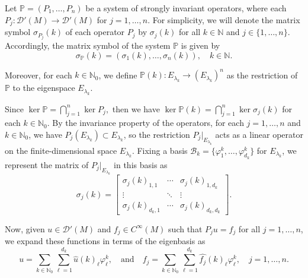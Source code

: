 \documentclass{amsart}
\theoremstyle{definition}
\theoremstyle{remark}
\numberwithin{equation}{section}
\begin{document}
	
	Let $\mathbb{P}=(P_1,\dots,P_n)$ be a system of strongly invariant operators, where each $P_j:\mathscr{D}'(M)\to \mathscr{D}'(M)$ for $j=1,\dots,n$. For simplicity, we will denote the matrix symbol $\sigma_{P_j}(k)$ of each operator $P_j$ by $\sigma_j(k)$ for all $k\in\mathbb{N}$ and $j\in\{1,\dots,n\}$. Accordingly, the matrix symbol of the system $\mathbb{P}$ is given by  
	\begin{equation*}
		\sigma_{\mathbb{P}}(k) = (\sigma_1(k), \ldots, \sigma_n(k)), \quad k\in\mathbb{N}.
	\end{equation*}
	
	Moreover, for each $k\in\mathbb{N}_0$, we define $\mathbb{P}(k):E_{\lambda_k}\to (E_{\lambda_k})^n$ as the restriction of $\mathbb{P}$ to the eigenspace $E_{\lambda_k}$.

	
	Since $\ker\mathbb{P} = \bigcap_{j=1}^n\ker P_j,$  then we have $\ker \mathbb{P}(k) = \bigcap_{j=1}^n\ker\sigma_j(k)$ for each $k\in\mathbb{N}_0$. By the invariance property of the operators, for each $j=1,\dots,n$ and $k\in\mathbb{N}_0$, we have $P_j(E_{\lambda_k})\subset E_{\lambda_k}$, so the restriction $P_j|_{E_{\lambda_k}}$ acts as a linear operator on the finite-dimensional space $E_{\lambda_k}$. Fixing a basis $\mathcal{B}_k = \{\varphi^k_1, \dots, \varphi^k_{d_k}\}$ for $E_{\lambda_k}$, we represent the matrix of $P_j|_{E_{\lambda_k}}$ in this basis as  
\begin{equation*}
	\sigma_j(k)=\begin{bmatrix}
		\sigma_j(k)_{1,1}&\cdots & \sigma_j(k)_{1,d_k}\\
		\vdots & \ddots & \vdots\\
		\sigma_j(k)_{d_k,1}&\cdots& \sigma_j(k)_{d_k,d_k}
	\end{bmatrix}.
\end{equation*}

Now, given $u\in\mathscr{D}'(M)$ and $f_j\in C^\infty(M)$ such that $P_j u = f_j$ for all $j=1,\dots,n$, we expand these functions in terms of the eigenbasis as  
\begin{equation*}
	u = \sum_{k\in\mathbb{N}_0}\sum_{\ell=1}^{d_k}\widehat{u}(k)_\ell\varphi_\ell^k,  
	\quad \text{and} \quad  
	f_j = \sum_{k\in\mathbb{N}_0}\sum_{\ell=1}^{d_k}\widehat{f_j}(k)_\ell\varphi_\ell^k, \quad j=1,\dots,n.
\end{equation*}
\end{document}
